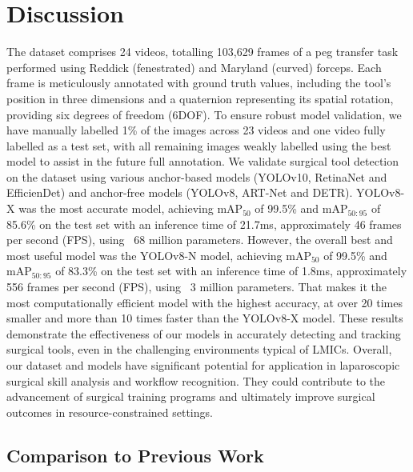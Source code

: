 \section{Discussion}

The dataset comprises 24 videos, totalling 103,629 frames of a peg transfer task performed using Reddick (fenestrated) and Maryland (curved) forceps. Each frame is meticulously annotated with ground truth values, including the tool's position in three dimensions and a quaternion representing its spatial rotation, providing six degrees of freedom (6DOF). To ensure robust model validation, we have manually labelled 1\% of the images across 23 videos and one video fully labelled as a test set, with all remaining images weakly labelled using the best model to assist in the future full annotation. We validate surgical tool detection on the dataset using various anchor-based models (YOLOv10, RetinaNet and EfficienDet) and anchor-free models (YOLOv8, ART-Net and DETR). YOLOv8-X was the most accurate model, achieving mAP$_{50}$ of 99.5\% and mAP$_{50:95}$ of 85.6\% on the test set with an inference time of 21.7ms, approximately 46 frames per second (FPS), using ~68 million parameters. However, the overall best and most useful model was the YOLOv8-N model, achieving mAP$_{50}$ of 99.5\% and mAP$_{50:95}$ of 83.3\% on the test set with an inference time of 1.8ms, approximately 556 frames per second (FPS), using ~3 million parameters. That makes it the most computationally efficient model with the highest accuracy, at over 20 times smaller and more than 10 times faster than the YOLOv8-X model. These results demonstrate the effectiveness of our models in accurately detecting and tracking surgical tools, even in the challenging environments typical of LMICs. Overall, our dataset and models have significant potential for application in laparoscopic surgical skill analysis and workflow recognition. They could contribute to the advancement of surgical training programs and ultimately improve surgical outcomes in resource-constrained settings.

\subsection{Comparison to Previous Work}

